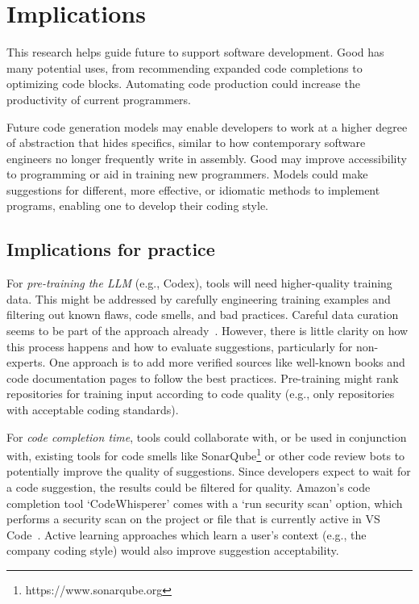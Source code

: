 \section{Implications}
\label{implications}
This research helps guide future \cct{} to support software development. 
Good \cct{} has many potential uses, from recommending expanded code completions to optimizing code blocks. Automating code production could increase the productivity of current programmers. 

Future code generation models may enable developers to work at a higher degree of abstraction that hides specifics, similar to how contemporary software engineers no longer frequently write in assembly.
Good \cct{} may improve accessibility to programming or aid in training new programmers. Models could make suggestions for different, more effective, or idiomatic methods to implement programs, enabling one to develop their coding style.

\subsection{Implications for practice}
For \emph{pre-training the LLM} (e.g., Codex), \AISE{} tools will need higher-quality training data. This might be addressed by carefully engineering training examples and filtering out known flaws, code smells, and bad practices. Careful data curation seems to be part of the approach already~\cite{alphacode}. However, there is little clarity on how this process happens and how to evaluate suggestions, particularly for non-experts. One approach is to add more verified sources like well-known books and code documentation pages to follow the best practices. 
Pre-training might rank repositories for training input according to code quality (e.g., only repositories with acceptable coding standards).

For \emph{code completion time}, \AISE{} tools could collaborate with, or be used in conjunction with, existing tools for code smells like SonarQube\footnote{https://www.sonarqube.org} or other code review bots to potentially improve the quality of suggestions. Since developers expect to wait for a code suggestion, the results could be filtered for quality. 
Amazon's code completion tool `CodeWhisperer' comes with a `run security scan' option, which performs a security scan on the project or file that is currently active in VS Code~\cite{amazon}.
Active learning approaches which learn a user's context (e.g., the company coding style) would also improve suggestion acceptability. %

